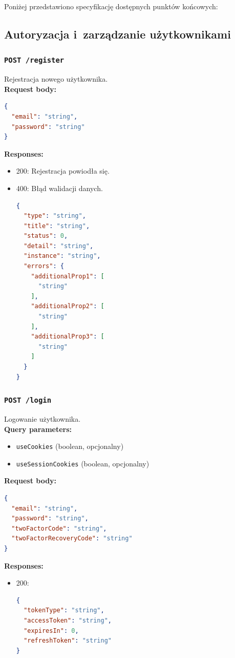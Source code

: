 Poniżej przedstawiono specyfikację dostępnych punktów końcowych:

\subsection{Autoryzacja i~zarządzanie użytkownikami}
\subsubsection{\lstinline[language=http]{POST /register}}
Rejestracja nowego użytkownika. \\
\textbf{Request body:}
\begin{lstlisting}[language=json]
{
  "email": "string",
  "password": "string"
}
\end{lstlisting}
\textbf{Responses:}
\begin{itemize}
    \item 200: Rejestracja powiodła się.
    \item 400: Błąd walidacji danych.
\begin{lstlisting}[language=json]
{
  "type": "string",
  "title": "string",
  "status": 0,
  "detail": "string",
  "instance": "string",
  "errors": {
    "additionalProp1": [
      "string"
    ],
    "additionalProp2": [
      "string"
    ],
    "additionalProp3": [
      "string"
    ]
  }
}
\end{lstlisting}
\end{itemize}

\subsubsection{\lstinline[language=http]{POST /login}}
Logowanie użytkownika. \\
\textbf{Query parameters:}
\begin{itemize}
    \item \texttt{useCookies} (boolean, opcjonalny)
    \item \texttt{useSessionCookies} (boolean, opcjonalny)
\end{itemize}
\textbf{Request body:}
\begin{lstlisting}[language=json]
{
  "email": "string",
  "password": "string",
  "twoFactorCode": "string",
  "twoFactorRecoveryCode": "string"
}
\end{lstlisting}
\textbf{Responses:}
\begin{itemize}
    \item 200:
\begin{lstlisting}[language=json]
{
  "tokenType": "string",
  "accessToken": "string",
  "expiresIn": 0,
  "refreshToken": "string"
}
\end{lstlisting}
\end{itemize}

